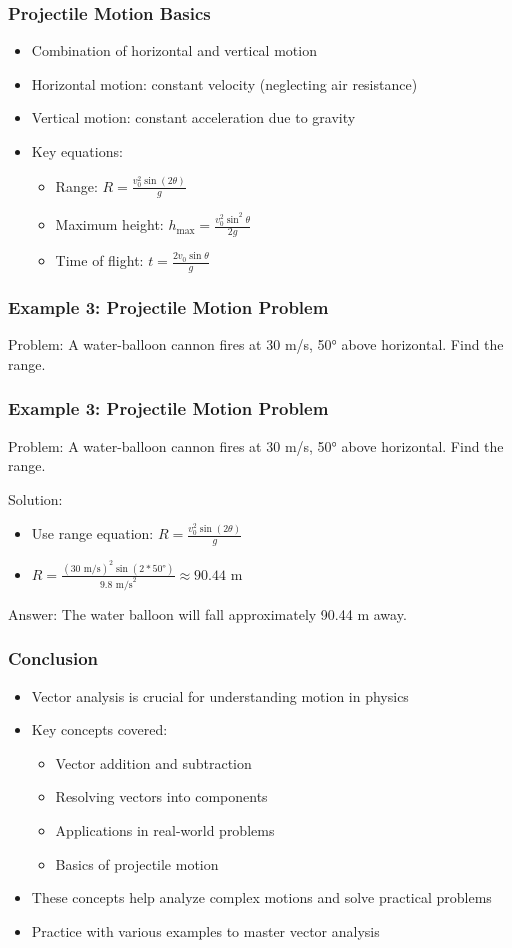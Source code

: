 \documentclass{beamer}
\begin{document}
\begin{frame}
\frametitle{Projectile Motion Basics}
\begin{itemize}
    \item Combination of horizontal and vertical motion
    \item Horizontal motion: constant velocity (neglecting air resistance)
    \item Vertical motion: constant acceleration due to gravity
    \item Key equations:
    \begin{itemize}
        \item Range: $R = \frac{v_0^2 \sin(2\theta)}{g}$
        \item Maximum height: $h_{\max} = \frac{v_0^2 \sin^2\theta}{2g}$
        \item Time of flight: $t = \frac{2v_0 \sin\theta}{g}$
    \end{itemize}
\end{itemize}
\end{frame}

\begin{frame}
\frametitle{Example 3: Projectile Motion Problem}
Problem: A water-balloon cannon fires at 30 m/s, 50° above horizontal. Find the range.

\end{frame}
\begin{frame}
\frametitle{Example 3: Projectile Motion Problem}
Problem: A water-balloon cannon fires at 30 m/s, 50° above horizontal. Find the range.

Solution:
\begin{itemize}
    \item Use range equation: $R = \frac{v_0^2 \sin(2\theta)}{g}$
    \item $R = \frac{(30 \text{ m/s})^2 \sin(2 * 50°)}{9.8 \text{ m/s}^2} \approx 90.44$ m
\end{itemize}
Answer: The water balloon will fall approximately 90.44 m away.
\end{frame}
\begin{frame}
\frametitle{Conclusion}
\begin{itemize}
    \item Vector analysis is crucial for understanding motion in physics
    \item Key concepts covered:
    \begin{itemize}
        \item Vector addition and subtraction
        \item Resolving vectors into components
        \item Applications in real-world problems
        \item Basics of projectile motion
    \end{itemize}
    \item These concepts help analyze complex motions and solve practical problems
    \item Practice with various examples to master vector analysis
\end{itemize}
\end{frame}
\end{document}
